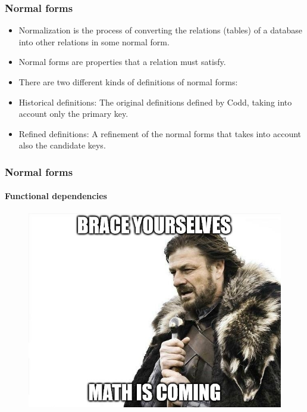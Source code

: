 \documentclass{beamer}
\begin{document}
\begin{frame}
	\frametitle{Normal forms}
	\begin{itemize}
		\item Normalization is the process of converting the relations (tables) of a database into other relations in some normal form.
		\item Normal forms are properties that a relation must satisfy.
		\pause
		\item There are two different kinds of definitions of normal forms:
		\item Historical definitions: The original definitions defined by Codd, taking into account only the primary key.
		\item Refined definitions: A refinement of the normal forms that takes into account also the candidate keys.		
	\end{itemize}
\end{frame}

\begin{frame}
	\frametitle{Normal forms}
	\framesubtitle{Functional dependencies}
	
	\begin{figure}
		\includegraphics[scale=0.75]{img/normalization/mathiscoming}
	\end{figure}
\end{frame}
\end{document}
